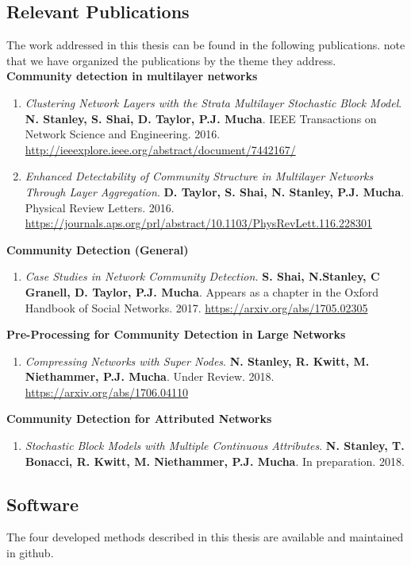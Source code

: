 \subsection{Relevant Publications}
The work addressed in this thesis can be found in the following publications. note that we have organized the publications by the theme they address. \\

{\bf Community detection in multilayer networks}
\begin{enumerate}
\item \emph{Clustering Network Layers with the Strata Multilayer Stochastic Block Model}. {\bf N. Stanley, S. Shai, D. Taylor, P.J. Mucha}. IEEE Transactions on Network Science and Engineering. 2016. \url{http://ieeexplore.ieee.org/abstract/document/7442167/}
\item \emph{Enhanced Detectability of Community Structure in Multilayer Networks Through Layer Aggregation}. {\bf D. Taylor, S. Shai, N. Stanley, P.J. Mucha}. Physical Review Letters. 2016. \url{https://journals.aps.org/prl/abstract/10.1103/PhysRevLett.116.228301}
\end{enumerate}

{\bf Community Detection (General)}
\begin{enumerate}
\item \emph{Case Studies in Network Community Detection.} {\bf S. Shai, N.Stanley, C Granell, D. Taylor, P.J. Mucha}. Appears as a chapter in the Oxford Handbook of Social Networks. 2017. \url{https://arxiv.org/abs/1705.02305}
\end{enumerate}

{\bf Pre-Processing for Community Detection in Large Networks}
\begin{enumerate}
\item \emph{Compressing Networks with Super Nodes}. {\bf N. Stanley, R. Kwitt, M. Niethammer, P.J. Mucha}. Under Review. 2018. \url{https://arxiv.org/abs/1706.04110}
\end{enumerate}

 {\bf Community Detection for Attributed Networks}
 \begin{enumerate}
 \item \emph{Stochastic Block Models with Multiple Continuous Attributes}. {\bf N. Stanley, T. Bonacci, R. Kwitt, M. Niethammer, P.J. Mucha}. In preparation. 2018. 
 \end{enumerate}
 
 \subsection{Software}
 The four developed methods described in this thesis are available and maintained in github. 
 
